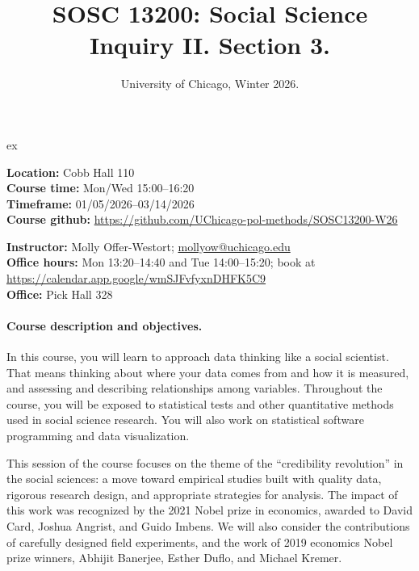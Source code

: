 \documentclass[letterpaper, 12pt, parskip=full,DIV=10]{scrartcl}
\title{SOSC 13200: Social Science Inquiry II. Section 3.}
\subtitle{University of Chicago, Winter 2026.}
\begin{document}
\maketitle

 ex

\textbf{Location:} Cobb Hall 110\\
\textbf{Course time:} Mon/Wed 15:00--16:20\\
\textbf{Timeframe:} 01/05/2026--03/14/2026\\
\textbf{Course github:} \url{https://github.com/UChicago-pol-methods/SOSC13200-W26}

\textbf{Instructor:} Molly Offer-Westort; \href{mailto:mollyow@uchicago.edu}{mollyow@uchicago.edu}\\
\textbf{Office hours:} Mon 13:20--14:40 and Tue 14:00--15:20; book at \url{https://calendar.app.google/wmSJFvfyxnDHFK5C9}\\
\textbf{Office:} Pick Hall 328

\paragraph{Course description and objectives.}
In this course, you will learn to approach data thinking like a social scientist.
That means thinking about where your data comes from and how it is measured, and assessing and describing relationships among variables.
Throughout the course, you will be exposed to statistical tests and other quantitative methods used in social science research.
You will also work on statistical software programming and data visualization.

This session of the course focuses on the theme of the ``credibility revolution'' in the social sciences:
a move toward empirical studies built with quality data, rigorous research design, and appropriate strategies for analysis.
The impact of this work was recognized by the 2021 Nobel prize in economics, awarded to David Card, Joshua Angrist, and Guido Imbens.
We will also consider the contributions of carefully designed field experiments, and the work of 2019 economics Nobel prize winners, Abhijit Banerjee, Esther Duflo, and Michael Kremer.
\end{document}
